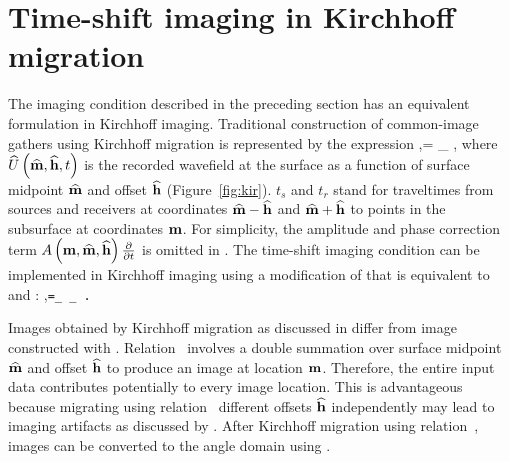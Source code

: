 \section{Time-shift imaging in Kirchhoff migration}
The imaging condition described in the preceding section
has an equivalent formulation in Kirchhoff imaging.
Traditional construction of common-image gathers using
Kirchhoff migration is represented by the expression
\beq \label{eqn:KirOld}
\RR \lp \mm,\ho \rp =
\sum_{\mo} 
\Uo \left[\mo,\ho, 
        t_s \lp \mm,\mo-\ho \rp +
        t_r \lp \mm,\mo+\ho \rp
    \right]
\;,
\eeq
where $\widehat{U}\left ({ \widehat{\bf m}},{ \widehat{\bf h}},t\right )$ is the recorded wavefield at 
the surface as a function of surface 
midpoint ${ \widehat{\bf m}}$ and offset ${ \widehat{\bf h}}$ (Figure~\ref{fig:kir}).
$t_s$ and $t_r$ stand for traveltimes from sources and 
receivers at coordinates ${ \widehat{\bf m}}-{ \widehat{\bf h}}$ and ${ \widehat{\bf m}}+{ \widehat{\bf h}}$ to points 
in the subsurface at coordinates ${ \bf m}$.
For simplicity, the amplitude and phase correction term 
$A \left ( { \bf m},{ \widehat{\bf m}},{ \widehat{\bf h}} \right ) \frac{\partial}{\partial t}$
is omitted in .
The time-shift imaging condition can be implemented 
in Kirchhoff imaging using a modification
of  that is equivalent to 
 and :
\beq \label{eqn:KirNew}
\RR \lp \mm,\tt \rp=\sum_{\mo} \sum_{\ho}
\Uo \left[                \mo,\ho, 
              t_s \lp \mm,\mo-\ho \rp +
              t_r \lp \mm,\mo+\ho \rp + 2 \tt
    \right] \;.
\eeq

Images obtained by Kirchhoff migration as discussed in 
 differ from image constructed with .
Relation~ involves a double summation over
surface midpoint ${ \widehat{\bf m}}$ and offset ${ \widehat{\bf h}}$ to produce an image 
at location ${ \bf m}$. Therefore, the entire input data contributes
potentially to every image location.
This is advantageous because migrating using
relation~ different offsets ${ \widehat{\bf h}}$ independently
may lead to imaging artifacts as discussed by 
\cite{GEO69-02-05620575}.
After Kirchhoff migration using relation~,
images can be converted to the angle domain using .
